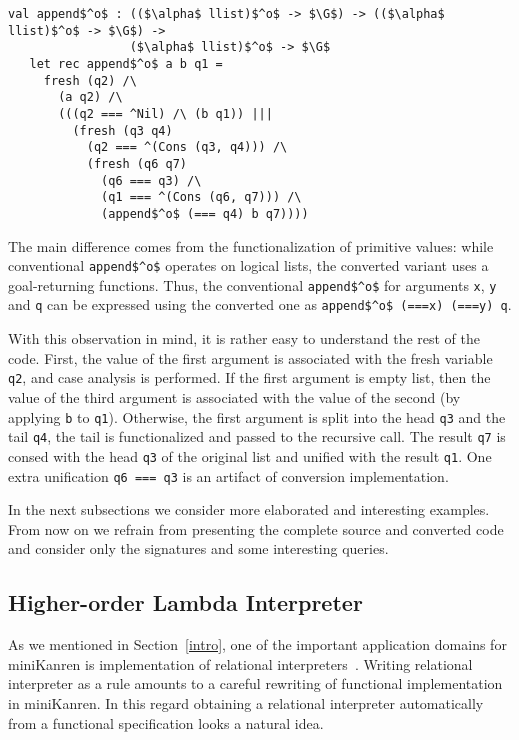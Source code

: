 \begin{lstlisting}[basicstyle=\small]
   val append$^o$ : (($\alpha$ llist)$^o$ -> $\G$) -> (($\alpha$ llist)$^o$ -> $\G$) -> 
                 ($\alpha$ llist)$^o$ -> $\G$
   let rec append$^o$ a b q1 =
     fresh (q2) /\
       (a q2) /\
       (((q2 === ^Nil) /\ (b q1)) |||
         (fresh (q3 q4)
           (q2 === ^(Cons (q3, q4))) /\
           (fresh (q6 q7)
             (q6 === q3) /\             
             (q1 === ^(Cons (q6, q7))) /\
             (append$^o$ (=== q4) b q7))))
\end{lstlisting}

The main difference comes from the functionalization of primitive values: while conventional \lstinline|append$^o$| operates
on logical lists, the converted variant uses a goal-returning functions. Thus, the conventional \lstinline{append$^o$} for arguments
\lstinline|x|, \lstinline|y| and \lstinline|q| can be expressed using the converted one as \lstinline{append$^o$ (===x) (===y) q}.

With this observation in mind, it is rather easy to understand the rest of the code. First, the value of the first argument is
associated with the fresh variable \lstinline|q2|, and case analysis is performed. If the first argument is empty list, then the 
value of the third argument is associated with the value of the second (by applying \lstinline|b| to \lstinline|q1|). Otherwise, the first
argument is split into the head \lstinline|q3| and the tail \lstinline|q4|, the tail is functionalized and passed to the recursive
call. The result \lstinline|q7| is consed with the head \lstinline|q3| of the original list and unified with the result \lstinline|q1|. One extra
unification \lstinline|q6 === q3| is an artifact of conversion implementation.

In the next subsections we consider more elaborated and interesting examples. From now on we refrain from presenting the complete source and
converted code and consider only the signatures and some interesting queries. 

\subsection{Higher-order Lambda Interpreter}

As we mentioned in Section~\ref{intro}, one of the important application domains for miniKanren is implementation of relational interpreters~\cite{WillThesis,unified,Untagged}. 
Writing relational interpreter as a rule amounts to a careful rewriting of functional implementation in miniKanren. In this regard obtaining a relational
interpreter automatically from a functional specification looks a natural idea.

